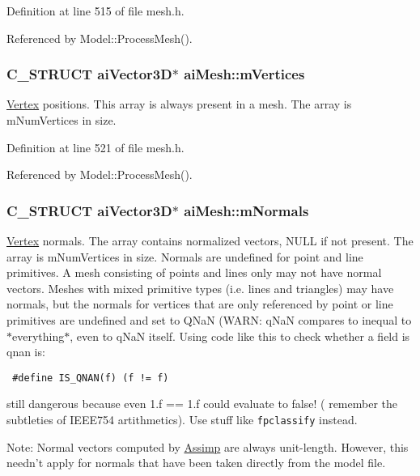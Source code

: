 Definition at line 515 of file mesh.h.

Referenced by Model::ProcessMesh().\hypertarget{structai_mesh_fd4588abb3e1c72821ae0234a3850662}{
\subsubsection[mVertices]{\setlength{\rightskip}{0pt plus 5cm}C\_\-STRUCT aiVector3D$\ast$ {\bf aiMesh::mVertices}}}
\label{structai_mesh_fd4588abb3e1c72821ae0234a3850662}


\hyperlink{class_vertex}{Vertex} positions. This array is always present in a mesh. The array is mNumVertices in size. 

Definition at line 521 of file mesh.h.

Referenced by Model::ProcessMesh().\hypertarget{structai_mesh_ec81b496b4d93838cef038933dabe9b9}{
\subsubsection[mNormals]{\setlength{\rightskip}{0pt plus 5cm}C\_\-STRUCT aiVector3D$\ast$ {\bf aiMesh::mNormals}}}
\label{structai_mesh_ec81b496b4d93838cef038933dabe9b9}


\hyperlink{class_vertex}{Vertex} normals. The array contains normalized vectors, NULL if not present. The array is mNumVertices in size. Normals are undefined for point and line primitives. A mesh consisting of points and lines only may not have normal vectors. Meshes with mixed primitive types (i.e. lines and triangles) may have normals, but the normals for vertices that are only referenced by point or line primitives are undefined and set to QNaN (WARN: qNaN compares to inequal to $\ast$everything$\ast$, even to qNaN itself. Using code like this to check whether a field is qnan is: 

\begin{Code}\begin{verbatim} #define IS_QNAN(f) (f != f)
\end{verbatim}
\end{Code}

 still dangerous because even 1.f == 1.f could evaluate to false! ( remember the subtleties of IEEE754 artithmetics). Use stuff like {\tt fpclassify} instead. \begin{Desc}
\item[Note:]Normal vectors computed by \hyperlink{namespace_assimp}{Assimp} are always unit-length. However, this needn't apply for normals that have been taken directly from the model file. \end{Desc}


